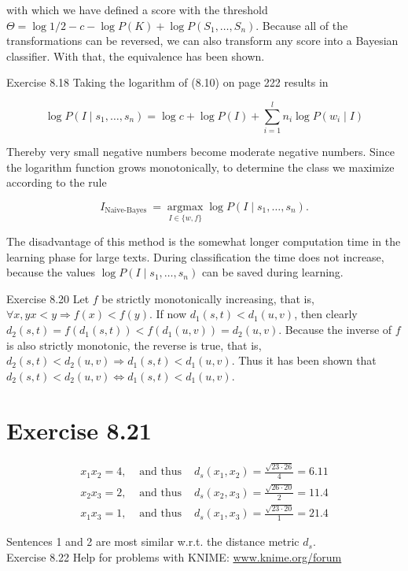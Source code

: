 \documentclass[10pt]{article}
\begin{document}
with which we have defined a score with the threshold $\Theta=\log 1 / 2-c-\log P(K)+ \log P\left(S_{1}, \ldots, S_{n}\right)$. Because all of the transformations can be reversed, we can also transform any score into a Bayesian classifier. With that, the equivalence has been shown.

Exercise 8.18 Taking the logarithm of (8.10) on page 222 results in

$$
\log P\left(I \mid s_{1}, \ldots, s_{n}\right)=\log c+\log P(I)+\sum_{i=1}^{l} n_{i} \log P\left(w_{i} \mid I\right)
$$

Thereby very small negative numbers become moderate negative numbers. Since the logarithm function grows monotonically, to determine the class we maximize according to the rule

$$
I_{\text {Naive-Bayes }}=\underset{I \in\{w, f\}}{\operatorname{argmax}} \log P\left(I \mid s_{1}, \ldots, s_{n}\right) .
$$

The disadvantage of this method is the somewhat longer computation time in the learning phase for large texts. During classification the time does not increase, because the values $\log P\left(I \mid s_{1}, \ldots, s_{n}\right)$ can be saved during learning.

Exercise 8.20 Let $f$ be strictly monotonically increasing, that is, $\forall x, y x<y \Rightarrow f(x)<f(y)$. If now $d_{1}(s, t)<d_{1}(u, v)$, then clearly $d_{2}(s, t)=f\left(d_{1}(s, t)\right)<f\left(d_{1}(u, v)\right)= d_{2}(u, v)$. Because the inverse of $f$ is also strictly monotonic, the reverse is true, that is, $d_{2}(s, t)<d_{2}(u, v) \Rightarrow d_{1}(s, t)<d_{1}(u, v)$. Thus it has been shown that $d_{2}(s, t)< d_{2}(u, v) \Leftrightarrow d_{1}(s, t)<d_{1}(u, v)$.

\section*{Exercise 8.21}
$$
\begin{array}{lll}
x_{1} x_{2}=4, & \text { and thus } & d_{s}\left(x_{1}, x_{2}\right)=\frac{\sqrt{23 \cdot 26}}{4}=6.11 \\
x_{2} x_{3}=2, & \text { and thus } & d_{s}\left(x_{2}, x_{3}\right)=\frac{\sqrt{26 \cdot 20}}{2}=11.4 \\
x_{1} x_{3}=1, & \text { and thus } & d_{s}\left(x_{1}, x_{3}\right)=\frac{\sqrt{23 \cdot 20}}{1}=21.4
\end{array}
$$

Sentences 1 and 2 are most similar w.r.t. the distance metric $d_{s}$.\\
Exercise 8.22 Help for problems with KNIME: \href{http://www.knime.org/forum}{www.knime.org/forum}
\end{document}
